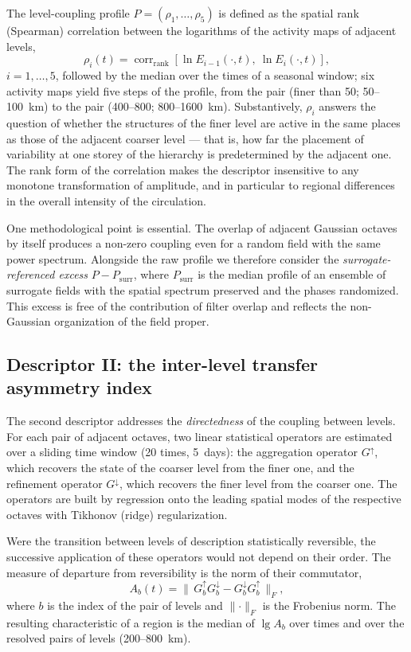 \documentclass[11pt,a4paper]{article}
\begin{document}
The level-coupling profile $P=(\rho_1,\dots,\rho_5)$ is defined as the spatial rank (Spearman) correlation between the logarithms of the activity maps of adjacent levels,
\begin{equation}
\rho_i(t)=\operatorname{corr}_{\mathrm{rank}}\!\left[\ln E_{i-1}(\cdot,t),\ \ln E_{i}(\cdot,t)\right],
\label{eq:rho}
\end{equation}
$i=1,\dots,5$, followed by the median over the times of a seasonal window; six activity maps yield five steps of the profile, from the pair (finer than 50; 50--100~km) to the pair (400--800; 800--1600~km). Substantively, $\rho_i$ answers the question of whether the structures of the finer level are active in the same places as those of the adjacent coarser level --- that is, how far the placement of variability at one storey of the hierarchy is predetermined by the adjacent one. The rank form of the correlation makes the descriptor insensitive to any monotone transformation of amplitude, and in particular to regional differences in the overall intensity of the circulation.

One methodological point is essential. The overlap of adjacent Gaussian octaves by itself produces a non-zero coupling even for a random field with the same power spectrum. Alongside the raw profile we therefore consider the \emph{surrogate-referenced excess} $P-P_{\mathrm{surr}}$, where $P_{\mathrm{surr}}$ is the median profile of an ensemble of surrogate fields with the spatial spectrum preserved and the phases randomized. This excess is free of the contribution of filter overlap and reflects the non-Gaussian organization of the field proper.

\subsection{Descriptor II: the inter-level transfer asymmetry index}

The second descriptor addresses the \emph{directedness} of the coupling between levels. For each pair of adjacent octaves, two linear statistical operators are estimated over a sliding time window (20 times, 5~days): the aggregation operator $G^{\uparrow}$, which recovers the state of the coarser level from the finer one, and the refinement operator $G^{\downarrow}$, which recovers the finer level from the coarser one. The operators are built by regression onto the leading spatial modes of the respective octaves with Tikhonov (ridge) regularization.

Were the transition between levels of description statistically reversible, the successive application of these operators would not depend on their order. The measure of departure from reversibility is the norm of their commutator,
\begin{equation}
A_b(t)=\bigl\lVert\,G^{\uparrow}_b G^{\downarrow}_b-G^{\downarrow}_b G^{\uparrow}_b\,\bigr\rVert_F,
\label{eq:A}
\end{equation}
where $b$ is the index of the pair of levels and $\lVert\cdot\rVert_F$ is the Frobenius norm. The resulting characteristic of a region is the median of $\lg A_b$ over times and over the resolved pairs of levels (200--800~km).
\end{document}
